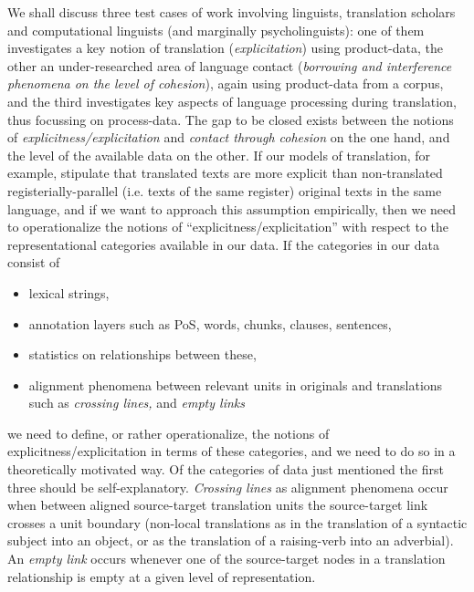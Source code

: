 \documentclass[output=paper]{LSP/langsci}
\begin{document}
We shall discuss three test cases of work involving linguists, translation scholars and computational linguists (and marginally psycholinguists): one of them investigates a key notion of translation (\textit{explicitation}) using product-data, the other an under-researched area of language contact (\textit{borrowing and interference phenomena on the level of cohesion}), again using product-data from a corpus, and the third investigates key aspects of language processing during translation, thus focussing on process-data. The gap to be closed exists between the notions of \textit{explicitness/explicitation} and \textit{contact through cohesion} on the one hand, and the level of the available data on the other. If our models of translation, for example, stipulate that translated texts are more explicit than non-translated registerially-parallel (i.e. texts of the same register) original texts in the same language, and if we want to approach this assumption empirically, then we need to operationalize the notions of ``explicitness/explicitation'' with respect to the representational categories available in our data. If the categories in our data consist of

\begin{itemize}
\item 
lexical strings,
\item
annotation layers such as PoS, words, chunks, clauses, sentences, 
\item
statistics on relationships between these, 
\item
alignment phenomena between relevant units in originals and translations such as \textit{crossing lines,} and \textit{empty links}
\end{itemize}

we need to define, or rather operationalize, the notions of explicitness\slash ex\-pli\-ci\-tation in terms of these categories, and we need to do so in a theoretically motivated way. Of the categories of data just mentioned the first three should be self-explanatory. \textit{Crossing lines} as alignment phenomena occur when between aligned source-target translation units the source-target link crosses a unit boundary (non-local translations as in the translation of a syntactic subject into an object, or as the translation of a raising-verb into an adverbial). An \textit{empty link} occurs whenever one of the source-target nodes in a translation relationship is empty at a given level of representation. 
\end{document}
